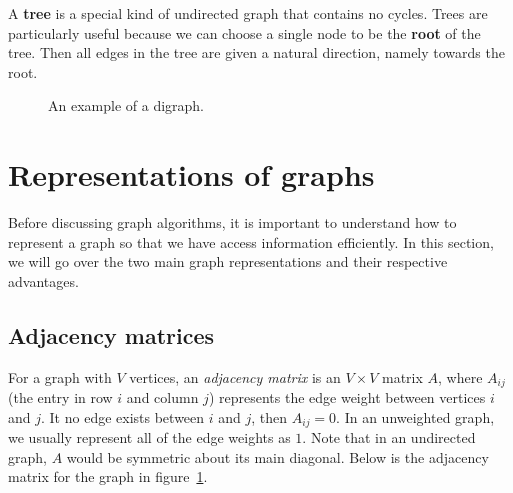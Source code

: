 A \textbf{tree} is a special kind of undirected graph that contains no cycles. Trees are particularly useful because we can choose a single node to be the \textbf{root} of the tree. Then all edges in the tree are given a natural direction, namely towards the root.

\begin{figure}
\centering
\begin{minipage}{0.48\linewidth}
\end{minipage}
\label{digraph-example}
\caption{An example of a digraph.}
\end{figure}


\section{Representations of graphs}

Before discussing graph algorithms, it is important to understand how to represent a graph so that we have access information efficiently. In this section, we will go over the two main graph representations and their respective advantages.

\subsection{Adjacency matrices}

For a graph with $V$ vertices, an \textit{adjacency matrix} is an $V \times V$ matrix $A$, where $A_{ij}$ (the entry in row $i$ and column $j$) represents the edge weight between vertices $i$ and $j$. It no edge exists between $i$ and $j$, then $A_{ij} = 0$. In an unweighted graph, we usually represent all of the edge weights as $1$. Note that in an undirected graph, $A$ would be symmetric about its main diagonal. Below is the adjacency matrix for the graph in figure~\ref{digraph-example}.

